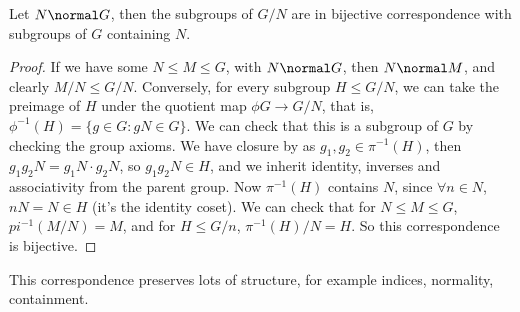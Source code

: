 \documentclass[a4]{scrreprt}
\begin{document}
\begin{theorem}
	Let $N \normal G$, then the subgroups of $G/N$ are in bijective correspondence with subgroups of $G$ containing $N$.
\end{theorem}
\begin{proof}
	If we have some $N \leq M \leq G$, with $N \normal G$, then $N \normal M$, and clearly $M/N \leq G/N$. Conversely, for every subgroup $H \leq G/N$, we can take the preimage of $H$ under the quotient map $\phi G \rightarrow G/N$, that is, $\phi^{-1}(H) = \{ g \in G : gN \in G \}$. We can check that this is a subgroup of $G$ by checking the group axioms.
	We have closure by as $g_1, g_2 \in \pi^{-1}(H)$, then $g_1 g_2 N = g_1 N \cdot g_2 N$, so $g_1 g_2 N \in H$, and we inherit identity, inverses and associativity from the parent group.
	Now $\pi^{-1}(H)$ contains $N$, since $\forall n \in N$, $nN = N \in H$ (it's the identity coset).
	We can check that for $N \leq M \leq G$, $pi^{-1}(M/N) = M$, and for $H \leq G/n$, $\pi^{-1}(H) / N = H$. So this correspondence is bijective.
\end{proof}

This correspondence preserves lots of structure, for example indices, normality, containment.
\end{document}
